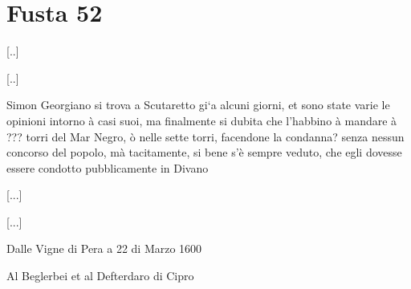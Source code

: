 \section{Fusta 52}


[..]

\startcifrato

[..]

Simon  Georgiano si  trova a  Scutaretto gi`a  alcuni giorni,  et sono
state varie le  opinioni intorno à casi suoi,  ma finalmente si dubita
che  l'habbino à  mandare à  ??? torri  del Mar  Negro, ò  nelle sette
torri,  facendone la condanna?  senza nessun  concorso del  popolo, mà
tacitamente,  si  bene s'è  sempre  veduto,  che  egli dovesse  essere
condotto pubblicamente in Divano

[...]

\stopcifrato

[...]

Dalle Vigne di Pera a 22 di Marzo 1600




\begin{center}
Al Beglerbei et al Defterdaro di Cipro
\end{center}

